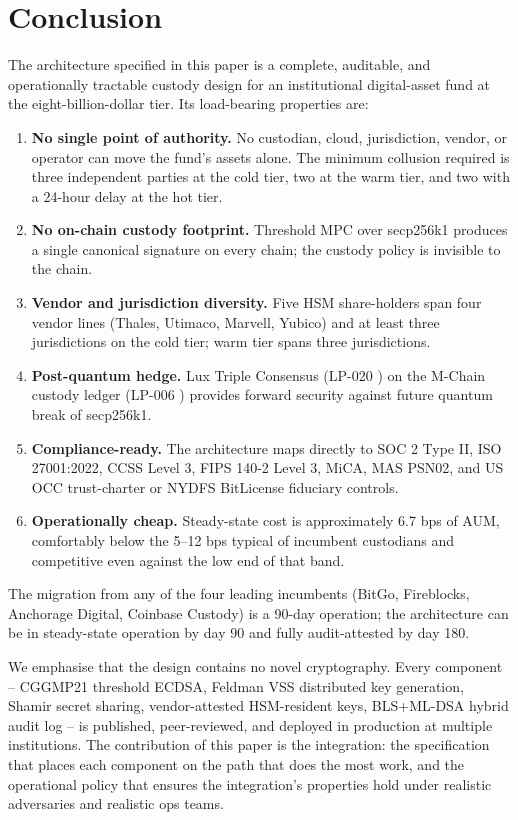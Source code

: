 \section{Conclusion}

\label{sec:conclusion}

The architecture specified in this paper is a complete, auditable,
and operationally tractable custody design for an institutional
digital-asset fund at the eight-billion-dollar tier. Its load-bearing
properties are:

\begin{enumerate}[nosep]
\item \textbf{No single point of authority.} No custodian, cloud,
jurisdiction, vendor, or operator can move the fund's assets alone.
The minimum collusion required is three independent parties at the
cold tier, two at the warm tier, and two with a 24-hour delay at
the hot tier.
\item \textbf{No on-chain custody footprint.} Threshold MPC over
secp256k1 produces a single canonical signature on every chain; the
custody policy is invisible to the chain.
\item \textbf{Vendor and jurisdiction diversity.} Five HSM
share-holders span four vendor lines (Thales, Utimaco, Marvell,
Yubico) and at least three jurisdictions on the cold tier; warm tier
spans three jurisdictions.
\item \textbf{Post-quantum hedge.} Lux Triple Consensus
(LP-020 \cite{lp020}) on the M-Chain custody ledger
(LP-006 \cite{lp006}) provides forward security against future
quantum break of secp256k1.
\item \textbf{Compliance-ready.} The architecture maps directly to
SOC 2 Type II, ISO 27001:2022, CCSS Level 3, FIPS 140-2 Level 3,
MiCA, MAS PSN02, and US OCC trust-charter or NYDFS BitLicense
fiduciary controls.
\item \textbf{Operationally cheap.} Steady-state cost is
approximately 6.7 bps of AUM, comfortably below the 5--12 bps
typical of incumbent custodians and competitive even against the
low end of that band.
\end{enumerate}

The migration from any of the four leading incumbents (BitGo,
Fireblocks, Anchorage Digital, Coinbase Custody) is a 90-day
operation; the architecture can be in steady-state operation by
day 90 and fully audit-attested by day 180.

We emphasise that the design contains no novel cryptography. Every
component -- CGGMP21 threshold ECDSA, Feldman VSS distributed
key generation, Shamir secret sharing, vendor-attested HSM-resident
keys, BLS+ML-DSA hybrid audit log -- is published, peer-reviewed,
and deployed in production at multiple institutions. The
contribution of this paper is the integration: the specification
that places each component on the path that does the most work, and
the operational policy that ensures the integration's properties
hold under realistic adversaries and realistic ops teams.

